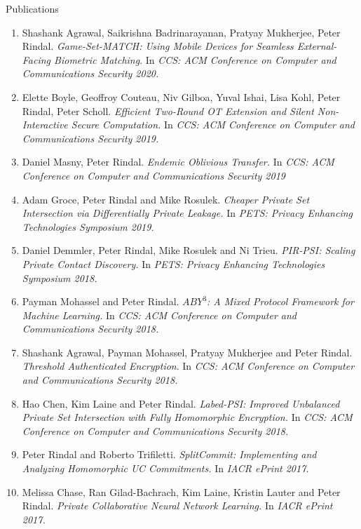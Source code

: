 \documentclass{resume} %
\begin{document}
\begin{rSection}{Publications}
\begin{enumerate}[label=C\arabic* --]
	\item Shashank Agrawal, Saikrishna Badrinarayanan, Pratyay Mukherjee, Peter Rindal.
	\emph{Game-Set-MATCH: Using Mobile Devices for Seamless External-Facing Biometric Matching}. In \emph{CCS: ACM Conference on Computer and Communications Security  2020.}
	
	\item Elette Boyle, Geoffroy Couteau, Niv Gilboa, Yuval Ishai, Lisa Kohl, Peter Rindal, Peter Scholl.
	\emph{Efficient Two-Round OT Extension and Silent Non-Interactive Secure Computation.} In \emph{CCS: ACM Conference on Computer and Communications Security   2019.}
	
	\item Daniel Masny, Peter Rindal. \emph{Endemic Oblivious Transfer.} In \emph{CCS: ACM Conference on Computer and Communications Security 2019}
	
	\item Adam Groce, Peter Rindal and Mike Rosulek. \emph{Cheaper Private Set Intersection  via Differentially Private Leakage.}  In \emph{PETS: Privacy Enhancing Technologies Symposium 2019.}
	
	\item Daniel Demmler, Peter Rindal, Mike Rosulek and Ni Trieu. \emph{PIR-PSI: Scaling Private Contact Discovery.}  In \emph{PETS: Privacy Enhancing Technologies Symposium 2018.}
	
	\item Payman Mohassel and Peter Rindal. \emph{$ABY^3$: A Mixed Protocol Framework for Machine Learning.} In \emph{CCS: ACM Conference on Computer and Communications Security 2018.}
	
	\item Shashank Agrawal, Payman Mohassel, Pratyay Mukherjee and Peter Rindal. \emph{Threshold Authenticated Encryption}. In \emph{CCS: ACM Conference on Computer and Communications Security 2018.}	
	
	\item Hao Chen, Kim Laine and Peter Rindal. \emph{Labed-PSI: Improved Unbalanced Private Set Intersection with Fully Homomorphic Encryption.} In \emph{CCS: ACM Conference on Computer and Communications Security 2018.}
	
	\item Peter Rindal and Roberto Trifiletti. \emph{SplitCommit: Implementing and Analyzing Homomorphic UC Commitments.} In \emph{IACR ePrint 2017.}
	
	\item Melissa Chase, Ran Gilad-Bachrach, Kim Laine, Kristin Lauter and Peter Rindal. \emph{Private Collaborative Neural Network Learning.} In \emph{IACR ePrint 2017.}
	

\end{enumerate}
\end{rSection}
\end{document}
